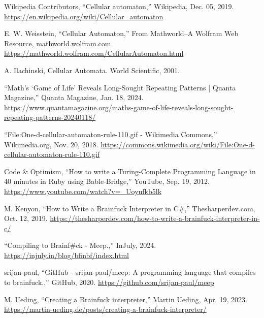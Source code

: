 \documentclass[12pt]{report} %
\begin{document}
\begin{singlespace}
\begin{thebibliography}{}
             Wikipedia Contributors, “Cellular automaton,” Wikipedia, Dec. 05, 2019. \href{https://en.wikipedia.org/wiki/Cellular_automaton}{https://en.wikipedia.org/wiki/Cellular\_automaton}

             E. W. Weisstein, “Cellular Automaton,” From Mathworld--A Wolfram Web Resource, mathworld.wolfram.com. \href{https://mathworld.wolfram.com/CellularAutomaton.html}{https://mathworld.wolfram.com/CellularAutomaton.html}

             A. Ilachinski, Cellular Automata. World Scientific, 2001.

             “Math’s ‘Game of Life’ Reveals Long-Sought Repeating Patterns | Quanta Magazine,” Quanta Magazine, Jan. 18, 2024. \href{https://www.quantamagazine.org/maths-game-of-life-reveals-long-sought-repeating-patterns-20240118/}{https://www.quantamagazine.org/maths-game-of-life-reveals-long-sought-repeating-patterns-20240118/}

             “File:One-d-cellular-automaton-rule-110.gif - Wikimedia Commons,” Wikimedia.org, Nov. 20, 2018. \href{https://commons.wikimedia.org/wiki/File:One-d-cellular-automaton-rule-110.gif}{https://commons.wikimedia.org/wiki/File:One-d-cellular-automaton-rule-110.gif}

             Code \& Optimism, “How to write a Turing-Complete Programming Language in 40 minutes in Ruby using Bable-Bridge,” YouTube, Sep. 19, 2012. \href{https://www.youtube.com/watch?v=_Uoyufkb5lk}{https://www.youtube.com/watch?v=\_Uoyufkb5lk}

             M. Kenyon, “How to Write a Brainfuck Interpreter in C\#,” Thesharperdev.com, Oct. 12, 2019. \href{https://thesharperdev.com/how-to-write-a-brainfuck-interpreter-in-c/}{https://thesharperdev.com/how-to-write-a-brainfuck-interpreter-in-c/}

             “Compiling to Brainf\#ck - Meep.,” InJuly, 2024. \href{https://injuly.in/blog/bfinbf/index.html}{https://injuly.in/blog/bfinbf/index.html}

             srijan-paul, “GitHub - srijan-paul/meep: A programming language that compiles to brainfuck.,” GitHub, 2020. \href{https://github.com/srijan-paul/meep}{https://github.com/srijan-paul/meep}

             M. Ueding, “Creating a Brainfuck interpreter,” Martin Ueding, Apr. 19, 2023. \href{https://martin-ueding.de/posts/creating-a-brainfuck-interpreter/}{https://martin-ueding.de/posts/creating-a-brainfuck-interpreter/}


\end{thebibliography}
\end{singlespace}
\end{document}
